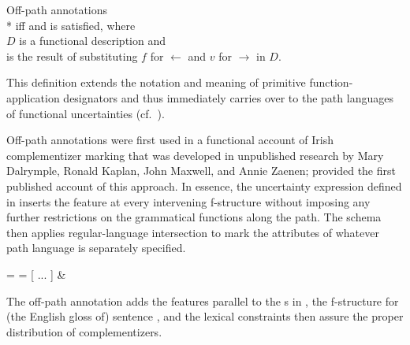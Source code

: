 \documentclass[output=paper,hidelinks]{langscibook}
\begin{document}
\ea\label{offpaths} Off-path annotations\\*
 iff  and
      is satisfied, where\\
\hsp{3em} $D$ is a functional description and\\
\hsp{3em}   is the result of substituting $f$ for $\leftarrow$ and $v$ for $\rightarrow$ in $D$.%
\z

\noindent This definition extends the notation and meaning of primitive function-applica\-tion designators  and thus immediately carries over to the path languages of functional uncertainties (cf.\ ).

Off-path annotations were first used in a functional account of Irish complementizer marking that was developed in unpublished research by Mary Dalrymple, Ronald Kaplan, John Maxwell, and Annie Zaenen; \citet{dalrymple01} provided the first published account of this approach.  In essence,  the uncertainty expression defined in  inserts the \ubd feature at every intervening f-structure without imposing any further restrictions on the grammatical functions along the path.  The  schema  then applies regular-language intersection to mark the attributes of whatever path language is separately specified.

\ea\label{lddmarkgen}
\ea\label{lddmark} = 
\ex\label{markpaths1} = [ ... ] \&    
\z\z

\noindent  The off-path annotation adds the  features parallel to the {\COMP}s in , the f-structure for (the English gloss of) sentence , and the lexical constraints  then assure the proper distribution of complementizers.
\end{document}
